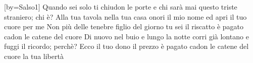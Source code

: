[by={Salso1}]
\beginverse
Quando sei solo
ti chiudon le porte
e chi sarà mai
questo triste straniero; chi è?
Alla tua tavola
nella tua casa
onori il mio nome
ed apri il tuo cuore per me
\endverse
\beginchorus
Non più delle tenebre
figlio del giorno tu sei
il riscatto è pagato
cadon le catene del cuore
\endchorus
\beginverse
Di nuovo nel buio
e lungo la notte
corri già lontano
e fuggi il ricordo; perchè?
Ecco il tuo dono
il prezzo è pagato
cadon le catene del cuore
la tua libertà
\endverse
\endsong
